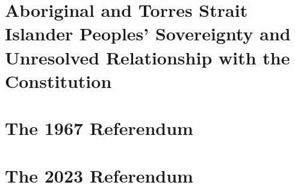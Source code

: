 \section{Aboriginal and Torres Strait Islander Peoples' Sovereignty and Unresolved Relationship with the Constitution}

\section{The 1967 Referendum}

\section{The 2023 Referendum}